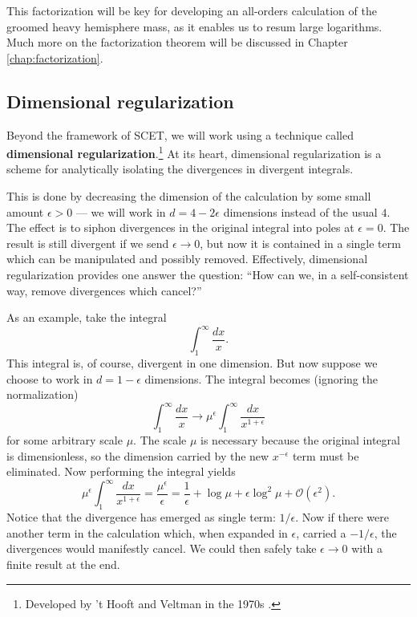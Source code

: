 \documentclass[../thesis.tex]{subfiles}
\providecommand{\cO}{\mathcal{O}}
\begin{document}
	This factorization will be key for developing an all-orders calculation of the groomed heavy hemisphere mass, as it enables us to resum large logarithms. Much more on the factorization theorem will be discussed in Chapter \ref{chap:factorization}.

\subsection{Dimensional regularization}
	Beyond the framework of SCET, we will work using a technique called \textbf{dimensional regularization}.\footnote{Developed by 't Hooft and Veltman in the 1970s \cite{t_hooft_regularization_1972}.} At its heart, dimensional regularization is a scheme for analytically isolating the divergences in divergent integrals. 

	This is done by decreasing the dimension of the calculation by some small amount $\epsilon > 0$ --- we will work in $d = 4 - 2\epsilon$ dimensions instead of the usual $4$. The effect is to siphon divergences in the original integral into poles at $\epsilon = 0$. The result is still divergent if we send $\epsilon \to 0$, but now it is contained in a single term which can be manipulated and possibly removed. Effectively, dimensional regularization provides one answer the question: ``How can we, in a self-consistent way, remove divergences which cancel?''

	As an example, take the integral
	\begin{equation}
		\int_1^\infty \frac{dx}{x}.
	\end{equation}
	This integral is, of course, divergent in one dimension. But now suppose we choose to work in $d = 1 - \epsilon$ dimensions. The integral becomes (ignoring the normalization)
	\begin{equation}
		\int_1^\infty \frac{dx}{x} \to \mu^\epsilon \int_1^\infty \frac{dx}{x^{1 + \epsilon}}
	\end{equation}
	for some arbitrary scale $\mu$. The scale $\mu$ is necessary because the original integral is dimensionless, so the dimension carried by the new $x^{-\epsilon}$ term must be eliminated. Now performing the integral yields
	\begin{equation}
		\mu^\epsilon \int_1^\infty \frac{dx}{x^{1 + \epsilon}} = \frac{\mu^\epsilon}{\epsilon} = \frac{1}{\epsilon} + \log \mu + \epsilon \log^2 \mu + \cO(\epsilon^2).
	\end{equation}
	Notice that the divergence has emerged as single term: $1/\epsilon$. Now if there were another term in the calculation which, when expanded in $\epsilon$, carried a $-1/\epsilon$, the divergences would manifestly cancel. We could then safely take $\epsilon \to 0$ with a finite result at the end.
\end{document}
